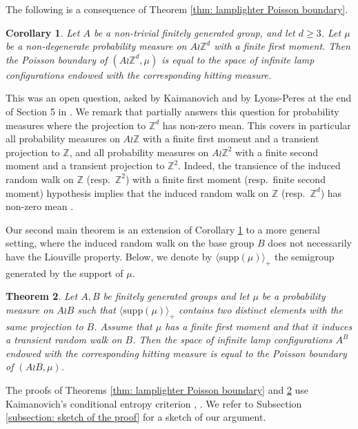 \documentclass[reqno,oneside,11pt]{amsart}
\newcommand{\Z}{\mathbb{Z}}
\newcommand{\supp}[1]{\mathrm{supp}(#1)}
\theoremstyle{plain}
\newtheorem{thm}{Theorem}[section] %
\newtheorem{cor}[thm]{Corollary}
\theoremstyle{definition}
\begin{document}
The following is a consequence of Theorem \ref{thm: lamplighter Poisson boundary}.

\begin{cor}\label{cor: finite first moment Zd poisson boundary} Let $A$ be a non-trivial finitely generated group, and let $d\ge 3$. Let $\mu$ be a non-degenerate probability measure on $A\wr \Z^d$ with a finite first moment. Then the Poisson boundary of $(A\wr \Z^d,\mu)$ is equal to the space of infinite lamp configurations endowed with the corresponding hitting measure.
\end{cor}
This was an open question, asked by Kaimanovich \cite[Example 3.6.7]{Kaimanovich2001} and by Lyons-Peres at the end of Section 5 in \cite{LyonsPeres2021}. We remark that \cite[Theorem 3.6.6]{Kaimanovich2001} partially answers this question for probability measures where the projection to $\Z^d$ has non-zero mean. This covers in particular all probability measures on $A\wr \Z$ with a finite first moment and a transient projection to $\Z$, and all probability measures on $A\wr \Z^2$ with a finite second moment and a transient projection to $\Z^2$. Indeed, the transience of the induced random walk on $\Z$ (resp.\ $\Z^2$) with a finite first moment (resp.\ finite second moment) hypothesis implies that the induced random walk on $\Z$ (resp.\ $\Z^d$) has non-zero mean \cite[Theorem 8.1]{Spitzer1976}.

Our second main theorem is an extension of Corollary \ref{cor: finite first moment Zd poisson boundary} to a more general setting, where the induced random walk on the base group $B$ does not necessarily have the Liouville property. Below, we denote by $\langle \supp{\mu}\rangle_{+}$ the semigroup generated by the support of $\mu$.
\begin{thm}\label{thm: Poisson for finite first moment}
	Let $A,B$ be finitely generated groups and let $\mu$ be a probability measure on $A\wr B$ such that $\langle \supp{\mu}\rangle_{+}$ contains two distinct elements with the same projection to $B$. Assume that $\mu$ has a finite first moment and that it induces a transient random walk on $B$. Then the space of infinite lamp configurations $A^B$ endowed with the corresponding hitting measure is equal to the Poisson boundary of $(A\wr B,\mu)$.
\end{thm}
The proofs of Theorems \ref{thm: lamplighter Poisson boundary} and \ref{thm: Poisson for finite first moment} use Kaimanovich's conditional entropy criterion \cite[Theorem 2]{Kaimanovich1985conditional}, \cite[Theorem 4.6]{Kaimanovich2000}. We refer to Subsection \ref{subsection: sketch of the proof} for a sketch of our argument. 
\end{document}
